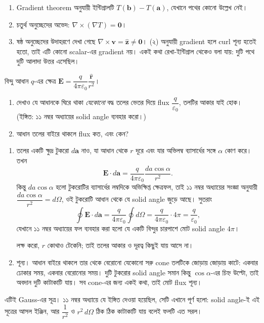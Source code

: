 \documentclass[11pt]{article}
\begin{document}
\begin{sol}
\begin{enumerate}
  \item Gradient theorem অনুযায়ী ইন্টিগ্রালটি $T(\mathbf{b}) -
        T(\mathbf{a})$, যেখানে পথের কোনো উল্লেখ নেই।
  \item চতুর্থ অনুচ্ছেদের অভেদ: $\nabla\times(\nabla T) = \mathbf{0}$।
  \item ষষ্ঠ অনুচ্ছেদের উদাহরণে দেখা গেছে
        $\nabla\times\mathbf{v} = \hat{\mathbf{z}} \neq \mathbf{0}$।
        (২) অনুযায়ী gradient হলে curl শূন্য হতেই হতো, তাই এটি কোনো
        scalar-এর gradient নয়। একই কথা রেখা-ইন্টিগ্রাল থেকেও বলা যায়:
        দুটি পথে দুটি আলাদা উত্তর এসেছিল।
\end{enumerate}
\end{sol}

 বিন্দু আধান $q$-এর ক্ষেত্র
$\mathbf{E} = \dfrac{q}{4\pi\varepsilon_{0}}\dfrac{\hat{\mathbf{r}}}{r^{2}}$।
\begin{enumerate}
  \item দেখাও যে আধানকে ঘিরে থাকা \emph{যেকোনো} বদ্ধ তলের ভেতর দিয়ে flux
        $\dfrac{q}{\varepsilon_{0}}$, তলটির আকার যাই হোক। (ইঙ্গিত: ১১ নম্বর
        অধ্যায়ের solid angle ব্যবহার করো।)
  \item আধান তলের বাইরে থাকলে flux কত, এবং কেন?
\end{enumerate}

\begin{sol}
\begin{enumerate}
  \item তলের একটি ক্ষুদ্র টুকরো $d\mathbf{a}$ নাও, যা আধান থেকে $r$ দূরে এবং
        যার অভিলম্ব ব্যাসার্ধের সঙ্গে $\alpha$ কোণ করে। তখন
        \[
          \mathbf{E}\cdot d\mathbf{a}
          = \frac{q}{4\pi\varepsilon_{0}}\frac{da\cos\alpha}{r^{2}} .
        \]
        কিন্তু $da\cos\alpha$ হলো টুকরোটির ব্যাসার্ধের লম্বদিকে অভিক্ষিপ্ত
        ক্ষেত্রফল, তাই ১১ নম্বর অধ্যায়ের সংজ্ঞা অনুযায়ী
        $\dfrac{da\cos\alpha}{r^{2}} = d\Omega$, ওই টুকরোটি আধান থেকে যে
        solid angle জুড়ে আছে। সুতরাং
        \[
          \oint\mathbf{E}\cdot d\mathbf{a}
          = \frac{q}{4\pi\varepsilon_{0}}\oint d\Omega
          = \frac{q}{4\pi\varepsilon_{0}} \cdot 4\pi
          = \frac{q}{\varepsilon_{0}} ,
        \]
        যেখানে ১১ নম্বর অধ্যায়ের ফল ব্যবহার করা হলো যে একটি বিন্দুর
        চারপাশে মোট solid angle $4\pi$।

        লক্ষ করো, $r$ কোথাও টেকেনি; তাই তলের আকার ও দূরত্ব কিছুই যায় আসে না।
  \item শূন্য। আধান বাইরে থাকলে তার থেকে বেরোনো যেকোনো সরু cone তলটিকে জোড়ায়
        জোড়ায় কাটে: একবার ঢোকার সময়, একবার বেরোনোর সময়। দুটি টুকরোর
        solid angle সমান কিন্তু $\cos\alpha$-এর চিহ্ন উল্টো, তাই অবদান
        দুটি কাটাকাটি যায়। সব cone-এর জন্য একই কথা, তাই মোট flux শূন্য।
\end{enumerate}
এটিই Gauss-এর সূত্র। ১১ নম্বর অধ্যায়ে যে ইঙ্গিত দেওয়া হয়েছিল, সেটি
এখানে পূর্ণ হলো: solid angle-ই এই সূত্রের আসল ইঞ্জিন, আর
$\dfrac{1}{r^{2}}$ ও $r^{2}\,d\Omega$ ঠিক ঠিক কাটাকাটি যায় বলেই ফলটি এত
সরল।
\end{sol}
\end{document}
